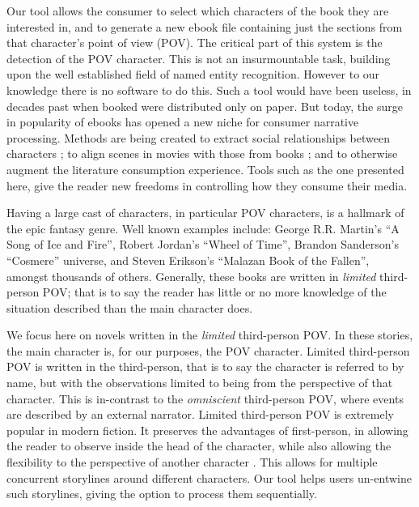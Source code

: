 \documentclass[]{book}
\begin{document}
Our tool allows the consumer to select which characters of the book they are interested in,
and to generate a new ebook file containing just the sections from that character's point of view (POV).
The critical part of this system is the detection of the POV character.
This is not an insurmountable task, building upon the well established field of named entity recognition.
However to our knowledge there is no software to do this.
Such a tool would have been useless, in decades past when booked were distributed only on paper.
But today, the surge in popularity of ebooks has opened a new niche for consumer narrative processing.
Methods are being created to extract social relationships between characters \parencite{elson2010socialnetworks,wohlgenannt2016extracting};
to align scenes in movies with those from books \parencite{moviebook}; and to otherwise augment the literature consumption experience.
Tools such as the one presented here, give the reader new freedoms in controlling how they consume their media.


Having a large cast of characters, in particular POV characters, is a hallmark of the epic fantasy genre.
Well known examples include: George R.R. Martin's ``A Song of Ice and Fire'', 
Robert Jordan's ``Wheel of Time'', Brandon Sanderson's ``Cosmere'' universe, and
Steven Erikson's ``Malazan Book of the Fallen'', amongst thousands of others.
Generally, these books are written in \emph{limited} third-person POV;
that is to say the reader has little or no more knowledge of the situation described than the main character does.

We focus here on novels written in the \emph{limited} third-person POV.
In these stories, the main character is, for our purposes, the POV character.
Limited third-person POV is written in the third-person, that is to say the character is referred to by name, but with the observations limited to being from the perspective of that character.
This is in-contrast to the \emph{omniscient} third-person POV, where events are described by an external narrator.
Limited third-person POV is extremely popular in modern fiction.
It preserves the advantages of first-person, in allowing the reader to observe inside the head of the character, while also allowing the flexibility to the perspective of another character \parencite{booth2010rhetoric}.
This allows for multiple concurrent storylines around different characters.
Our tool helps users un-entwine such storylines, giving the option to process them sequentially.
\end{document}
